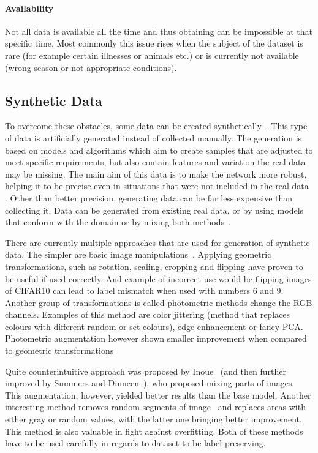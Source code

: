 \paragraph{Availability} Not all data is available all the time and thus obtaining can be impossible at that specific time. Most commonly this issue rises when the subject of the dataset is rare (for example certain illnesses or animals etc.) or is currently not available (wrong season or not appropriate conditions).

\subsection{Synthetic Data}
To overcome these obstacles, some data can be created synthetically~\cite{synthDataReview}. This type of data is artificially generated instead of collected manually. The generation is based on models and algorithms which aim to create samples that are adjusted to meet specific requirements, but also contain features and variation the real data may be missing. The main aim of this data is to make the network more robust, helping it to be precise even in situations that were not included in the real data \cite{synthDataRobust}. Other than better precision, generating data can be far less expensive than collecting it. Data can be generated from existing real data, or by using models that conform with the domain or by mixing both methods~\cite{synthData}.

There are currently multiple approaches that are used for generation of synthetic data.  The simpler are basic image manipulations~\cite{synthEasy}. Applying geometric transformations, such as rotation, scaling, cropping and flipping have proven to be useful if used correctly. And example of incorrect use would be flipping images of CIFAR10 can lead to label mismatch when used with numbers 6 and 9. Another group of transformations is called photometric methods change the RGB channels. Examples of this method are color jittering (method that replaces colours with different random or set colours), edge enhancement or fancy PCA. Photometric augmentation however shown smaller improvement when compared to geometric transformations~\cite{syntheticBasic}


Quite counterintuitive approach was proposed by Inoue~\cite{combineImages} (and then further improved by Summers and Dinneen~\cite{combineImprove}), who proposed mixing parts of images. This augmentation, however, yielded better results than the base model. Another interesting method removes random segments of image~\cite{erasing} and replaces areas with either gray or random values, with the latter one bringing better improvement. This method is also valuable in fight against overfitting. Both of these methods have to be used carefully in regards to dataset to be label-preserving.

